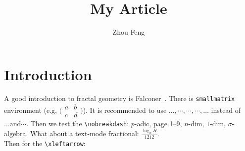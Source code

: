 \documentclass[12pt]{amsart}
\title[small title]{My Article}
\author{Zhou Feng}
\theoremstyle{plain}
\theoremstyle{definition}
\theoremstyle{remark}
\numberwithin{equation}{section} %
\newcommand{\Ndash}{\nobreakdash--}
\newcommand{\sigmaAlgebra}{$\sigma$\nobreakdash-algebra}
\newcommand{\ndiml}[1][n]{$#1$\nobreakdash-dim}
\newcommand{\padic}{$p$\nobreakdash-adic} %
\begin{document}
%	 
\baselineskip 15.2pt
\maketitle

%
%
%
%
%


\section{Introduction}\label{sec:intro}
A good introduction to fractal geometry is Falconer~\cite{Falconer2003}. There is \verb|smallmatrix| environment (e.g, $\big(\begin{smallmatrix}
			a & b\\ c&d
		\end{smallmatrix}\big)$). It is recommended to use $ \dotsc, \dotsb, \dotsm, \dotsi, \dotso $ instead of $ \ldots \text{and} \cdots$. Then we test the \verb|\nobreakdash|: \padic, page 1\Ndash9, \ndiml, \ndiml[1], \sigmaAlgebra.
What about a text-mode fractional: $ \tfrac{\log_{k} H}{1212} $.\\[20pt]
Then for the \verb|\xleftarrow|:
\end{document}
